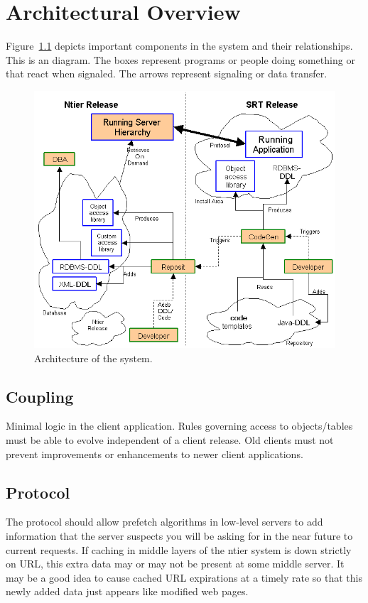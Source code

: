 \chapter{Architectural Overview}

Figure~\ref{fig:architecture}
depicts important components
in the system and their relationships. This is an \adhoc diagram. The
boxes represent programs or people doing something or that react when
signaled. The arrows represent signaling or data transfer.

\begin{figure}[hbt]
\includegraphics[width=\textwidth]{architecture.png}
\caption{Architecture of the \frontier system.\label{fig:architecture}}
\end{figure}

\section{Coupling}

Minimal logic in the client application.  Rules governing access to
objects/tables must be able to evolve independent of a client release.
Old clients must not prevent improvements or enhancements to newer
client applications.

\section{Protocol}

The protocol should allow prefetch algorithms in low-level servers to
add information that the server suspects you will be asking for in the
near future to current requests. If caching in middle layers of the
ntier system is down strictly on URL, this extra data may or may not
be present at some middle server. It may be a good idea to cause
cached URL expirations at a timely rate so that this newly added data
just appears like modified web pages.

